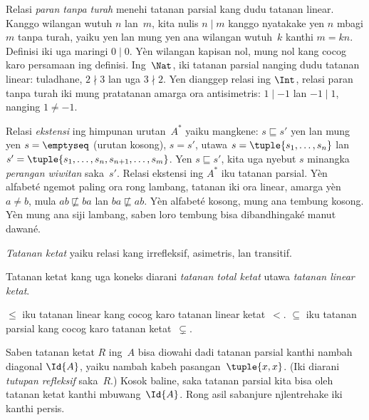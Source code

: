 \documentclass[../../../include/open-logic-section]{subfiles}
\begin{document}
\begin{ex}
Relasi \emph{paran tanpa turah} menehi tatanan
parsial kang dudu tatanan linear.
Kanggo wilangan wutuh $n$ lan~$m$,
kita nulis $n \mid m$ kanggo nyatakake yen $n$
mbagi $m$ tanpa turah, yaiku yen lan mung yen
ana wilangan wutuh~$k$ kanthi $m = kn$.
Definisi iki uga maringi $0\mid 0$. Yèn wilangan kapisan nol,
mung nol kang cocog karo persamaan ing definisi.
Ing~$\Nat$, iki tatanan parsial nanging dudu
tatanan linear: tuladhane, $2 \nmid 3$ lan uga
$3 \nmid 2$. Yen dianggep relasi ing $\Int$,
relasi paran tanpa turah iki mung pratatanan amarga ora
antisimetris: $1 \mid -1$ lan $-1 \mid 1$,
nanging $1 \neq -1$.
\end{ex}

\begin{ex}
Relasi \emph{ekstensi} ing himpunan urutan~$A^*$
yaiku mangkene: $s \sqsubseteq s'$ yen lan mung yen
$s = \emptyseq$ (urutan kosong), $s = s'$,
utawa $s = \tuple{s_1, \dots, s_n}$ lan
$s' =\tuple{s_1, \dots, s_n, s_{n+1}, \dots, s_m}$.
Yen $s \sqsubseteq s'$, kita uga nyebut $s$
minangka \emph{perangan wiwitan} saka~$s'$.
Relasi ekstensi ing $A^*$ iku tatanan parsial.
Yèn alfabeté ngemot paling ora rong lambang, tatanan iki
ora linear, amarga yèn
$a \neq b$, mula $ab \not\sqsubseteq ba$ lan
$ba \not\sqsubseteq ab$. Yèn alfabeté kosong, mung ana tembung kosong.
Yèn mung ana siji lambang, saben loro tembung bisa dibandhingaké
manut dawané.
\end{ex}

\begin{defn}
\emph{Tatanan ketat} yaiku relasi kang irrefleksif,
asimetris, lan transitif.
\end{defn}

\begin{defn}
Tatanan ketat kang uga koneks diarani
\emph{tatanan total ketat} utawa \emph{tatanan linear ketat}.
\end{defn}

\begin{ex}
$\le$ iku tatanan linear kang cocog karo
tatanan linear ketat~$<$.
$\subseteq$ iku tatanan parsial kang cocog karo
tatanan ketat~$\subsetneq$.
\end{ex}

Saben tatanan ketat $R$ ing~$A$ bisa diowahi dadi
tatanan parsial kanthi nambah diagonal $\Id{A}$,
yaiku nambah kabeh pasangan~$\tuple{x,x}$.
(Iki diarani \emph{tutupan refleksif} saka~$R$.)
Kosok baline, saka tatanan parsial kita bisa oleh
tatanan ketat kanthi mbuwang~$\Id{A}$.
Rong asil sabanjure njlentrehake iki kanthi persis.
\end{document}
